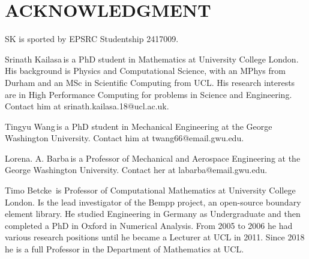 \documentclass{IEEEcsmag}
\begin{document}
\section{ACKNOWLEDGMENT}

SK is sported by EPSRC Studentship 2417009.





\begin{IEEEbiography}{Srinath Kailasa}{\,}is a PhD student in Mathematics at University College London. His background is Physics and Computational Science, with an MPhys from Durham and an MSc in Scientific Computing from UCL. His research interests are in High Performance Computing for problems in Science and Engineering. Contact him at srinath.kailasa.18@ucl.ac.uk.
\end{IEEEbiography}

\begin{IEEEbiography}{Tingyu Wang}{\,}is a PhD student in Mechanical Engineering at the George Washington University. Contact him at twang66@email.gwu.edu.
\end{IEEEbiography}

\begin{IEEEbiography}{Lorena. A. Barba}{\,}is a Professor of Mechanical and Aerospace Engineering at the George Washington University.  Contact her at labarba@email.gwu.edu.
\end{IEEEbiography}

\begin{IEEEbiography}{Timo Betcke}{\,} is Professor of Computational Mathematics at University College London. Is the lead investigator of the Bempp project, an open-source boundary element library. He studied Engineering in Germany as Undergraduate and then completed a PhD in Oxford in Numerical Analysis. From 2005 to 2006 he had various research positions until he became a Lecturer at UCL in 2011. Since 2018 he is a full Professor in the Department of Mathematics at UCL.
\end{IEEEbiography}
\end{document}
